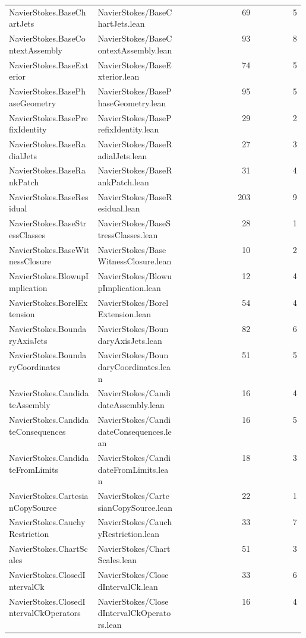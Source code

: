 \begin{longtable}{p{0.30\linewidth}p{0.28\linewidth}rr}
NavierStokes.BaseChartJets & NavierStokes/BaseChartJets.lean & 69 & 5\\
NavierStokes.BaseContextAssembly & NavierStokes/BaseContextAssembly.lean & 93 & 8\\
NavierStokes.BaseExterior & NavierStokes/BaseExterior.lean & 74 & 5\\
NavierStokes.BasePhaseGeometry & NavierStokes/BasePhaseGeometry.lean & 95 & 5\\
NavierStokes.BasePrefixIdentity & NavierStokes/BasePrefixIdentity.lean & 29 & 2\\
NavierStokes.BaseRadialJets & NavierStokes/BaseRadialJets.lean & 27 & 3\\
NavierStokes.BaseRankPatch & NavierStokes/BaseRankPatch.lean & 31 & 4\\
NavierStokes.BaseResidual & NavierStokes/BaseResidual.lean & 203 & 9\\
NavierStokes.BaseStressClasses & NavierStokes/BaseStressClasses.lean & 28 & 1\\
NavierStokes.BaseWitnessClosure & NavierStokes/BaseWitnessClosure.lean & 10 & 2\\
NavierStokes.BlowupImplication & NavierStokes/BlowupImplication.lean & 12 & 4\\
NavierStokes.BorelExtension & NavierStokes/BorelExtension.lean & 54 & 4\\
NavierStokes.BoundaryAxisJets & NavierStokes/BoundaryAxisJets.lean & 82 & 6\\
NavierStokes.BoundaryCoordinates & NavierStokes/BoundaryCoordinates.lean & 51 & 5\\
NavierStokes.CandidateAssembly & NavierStokes/CandidateAssembly.lean & 16 & 4\\
NavierStokes.CandidateConsequences & NavierStokes/CandidateConsequences.lean & 16 & 5\\
NavierStokes.CandidateFromLimits & NavierStokes/CandidateFromLimits.lean & 18 & 3\\
NavierStokes.CartesianCopySource & NavierStokes/CartesianCopySource.lean & 22 & 1\\
NavierStokes.CauchyRestriction & NavierStokes/CauchyRestriction.lean & 33 & 7\\
NavierStokes.ChartScales & NavierStokes/ChartScales.lean & 51 & 3\\
NavierStokes.ClosedIntervalCk & NavierStokes/ClosedIntervalCk.lean & 33 & 6\\
NavierStokes.ClosedIntervalCkOperators & NavierStokes/ClosedIntervalCkOperators.lean & 16 & 4\\

\end{longtable}
